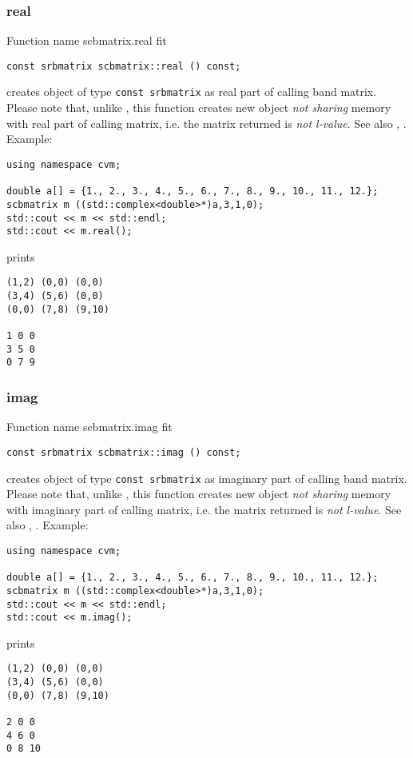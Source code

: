 \subsubsection{real}
Function%
\pdfdest name {scbmatrix.real} fit
\begin{verbatim}
const srbmatrix scbmatrix::real () const;
\end{verbatim}
creates  object of type \verb"const srbmatrix"
as  real part
of  calling band matrix.
Please note that, unlike
, this
function creates new object \emph{not sharing}  memory
with  real part of calling matrix, i.e.
the matrix returned is \emph{not  l-value}.
See also
,
.
Example:
\begin{Verbatim}
using namespace cvm;

double a[] = {1., 2., 3., 4., 5., 6., 7., 8., 9., 10., 11., 12.};
scbmatrix m ((std::complex<double>*)a,3,1,0);
std::cout << m << std::endl;
std::cout << m.real();
\end{Verbatim}
prints
\begin{Verbatim}
(1,2) (0,0) (0,0)
(3,4) (5,6) (0,0)
(0,0) (7,8) (9,10)

1 0 0
3 5 0
0 7 9
\end{Verbatim}
\newpage




\subsubsection{imag}
Function%
\pdfdest name {scbmatrix.imag} fit
\begin{verbatim}
const srbmatrix scbmatrix::imag () const;
\end{verbatim}
creates  object of type \verb"const srbmatrix"
as imaginary part
of  calling band matrix.
Please note that, unlike
, this
function creates new object \emph{not sharing}  memory
with  imaginary part of calling matrix, i.e.
the matrix returned is \emph{not  l-value}.
See also
,
.
Example:
\begin{Verbatim}
using namespace cvm;

double a[] = {1., 2., 3., 4., 5., 6., 7., 8., 9., 10., 11., 12.};
scbmatrix m ((std::complex<double>*)a,3,1,0);
std::cout << m << std::endl;
std::cout << m.imag();
\end{Verbatim}
prints
\begin{Verbatim}
(1,2) (0,0) (0,0)
(3,4) (5,6) (0,0)
(0,0) (7,8) (9,10)

2 0 0
4 6 0
0 8 10
\end{Verbatim}
\newpage



